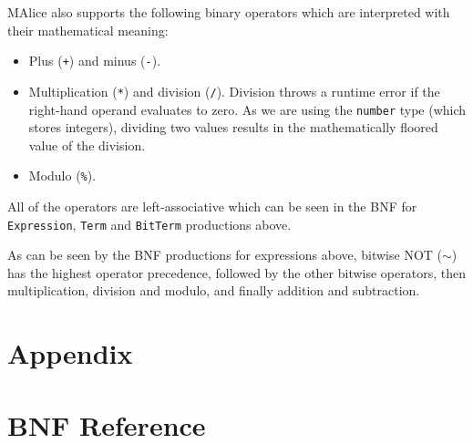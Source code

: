 \documentclass[a4wide, 11pt]{article}
\begin{document}
MAlice also supports the following binary operators which are interpreted with their mathematical meaning:

\begin{itemize}

\item Plus (\texttt{+}) and minus (\texttt{-}).
\item Multiplication (\texttt{*}) and division (\texttt{/}). Division throws a runtime error if the right-hand operand evaluates to zero. As we are using the \texttt{number} type (which stores integers), dividing two values results in the mathematically floored value of the division.
\item Modulo (\texttt{\%}).

\end{itemize}

All of the operators are left-associative which can be seen in the BNF for \texttt{Expression}, \texttt{Term} and \texttt{BitTerm} productions above.

As can be seen by the BNF productions for expressions above, bitwise NOT ($\sim$) has the highest operator precedence, followed by the other bitwise operators, then multiplication, division and modulo, and finally addition and subtraction.

\newpage	
\section{Appendix}
\appendix

\section{BNF Reference}
\end{document}
